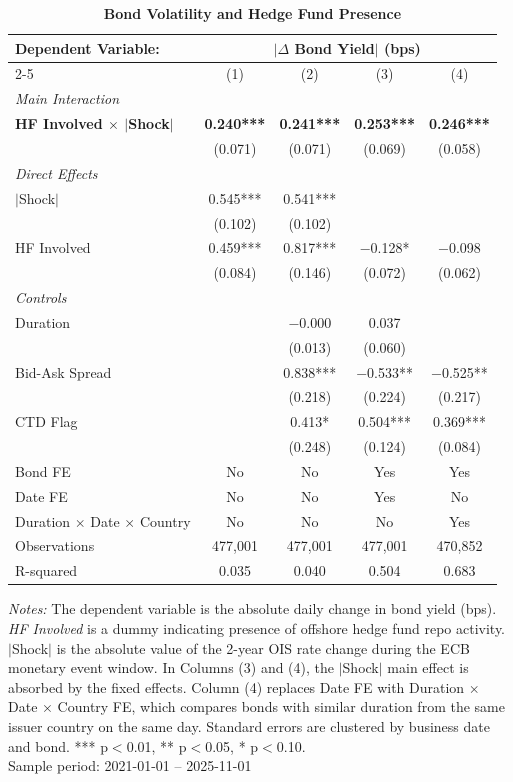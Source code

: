 \documentclass[english, 11pt, oneside]{article}
\begin{document}
\begin{table}[t]
\centering
\caption{\textbf{Bond Volatility and Hedge Fund Presence}}
\footnotesize
\setlength{\tabcolsep}{10pt}
\renewcommand{\arraystretch}{1.1}
\begin{tabular}{l c c c c}
\toprule
\textbf{Dependent Variable:} & \multicolumn{4}{c}{\textbf{$|\Delta$ Bond Yield$|$ (bps)}} \\
\cmidrule(lr){2-5}
 & (1) & (2) & (3) & (4) \\
\midrule
\textit{Main Interaction} & & & & \\
\textbf{HF Involved $\times$ $|$Shock$|$} & \textbf{0.240***} & \textbf{0.241***} & \textbf{0.253***} & \textbf{0.246***} \\
 & (0.071) & (0.071) & (0.069) & (0.058) \\
\addlinespace
\textit{Direct Effects} & & & & \\
$|$Shock$|$ & 0.545*** & 0.541*** &  &  \\
 & (0.102) & (0.102) &  &  \\
HF Involved & 0.459*** & 0.817*** & $-$0.128* & $-$0.098 \\
 & (0.084) & (0.146) & (0.072) & (0.062) \\
\addlinespace
\textit{Controls} & & & & \\
Duration & & $-$0.000 & 0.037 &  \\
 & & (0.013) & (0.060) &  \\
Bid-Ask Spread & & 0.838*** & $-$0.533** & $-$0.525** \\
 & & (0.218) & (0.224) & (0.217) \\
CTD Flag & & 0.413* & 0.504*** & 0.369*** \\
 & & (0.248) & (0.124) & (0.084) \\
\midrule
Bond FE & No & No & Yes & Yes \\
Date FE & No & No & Yes & No \\
Duration $\times$ Date $\times$ Country & No & No & No & Yes \\
\midrule
Observations & 477,001 & 477,001 & 477,001 & 470,852 \\
R-squared & 0.035 & 0.040 & 0.504 & 0.683 \\
\bottomrule
\end{tabular}
\label{tab:volatility}

\vspace{1ex}
\raggedright\scriptsize
\textit{Notes:} The dependent variable is the absolute daily change in bond yield (bps). \textit{HF Involved} is a dummy indicating presence of offshore hedge fund repo activity. $|$Shock$|$ is the absolute value of the 2-year OIS rate change during the ECB monetary event window. In Columns (3) and (4), the $|$Shock$|$ main effect is absorbed by the fixed effects. Column (4) replaces Date FE with Duration $\times$ Date $\times$ Country FE, which compares bonds with similar duration from the same issuer country on the same day. Standard errors are clustered by business date and bond. *** p$<$0.01, ** p$<$0.05, * p$<$0.10. \\ Sample period: 2021-01-01 -- 2025-11-01
\end{table}
\end{document}
